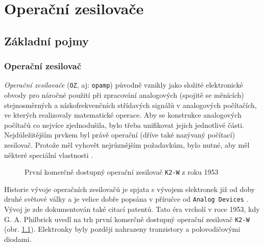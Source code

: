 \setchaptertoc
\chapter{Operační zesilovače}\label{aesIchIII}

  \section{Základní pojmy}\label{aesIchIIIsecI}
    \subsection{Operační zesilovač}\label{aesIchIIIsecIssecI}
      \emph{Operační zesilovače} (\texttt{OZ}, aj: \texttt{opamp}) původně vznikly jako složité
      elektronické obvody pro náročné použití při zpracování analogových (spojitě se měnících)
      stejnosměrných a nízkofrekvenčních střídavých signálů v analogových počítačích, ve kterých
      realizovaly matematické operace. Aby se konstrukce analogových počítačů co nejvíce
      zjednodušila, bylo třeba unifikovat jejich jednotlivé části. Nejdůležitějším prvkem byl právě
      operační (dříve také nazývaný počítací) zesilovač. Protože měl vyhovět nejrůznějším
      požadavkům, bylo nutné, aby měl některé speciální vlastnosti \cite[s.~12]{Belza2004}. 

      \begin{figure}[ht!]  %
        \centering
        \caption{První komerčně dostupný operační zesilovač \texttt{K2-W} z roku 1953
                \cite[s.~H.20]{Jung2005}}
        \label{aes:fig044}
      \end{figure} 

      Historie vývoje operačních zesilovačů je spjata s vývojem elektronek již od doby druhé světové
      války a je velice dobře popsána v příručce od \texttt{Analog Devices} \cite{Jung2005}. Vývoj
      je zde dokumentován také citací patentů. Tato éra vrcholí v roce 1953, kdy G. A. Philbrick
      uvedl na trh první komerčně dostupný operační zesilovač \texttt{K2-W} (obr. \ref{aes:fig044}).
      Elektronky byly později nahrazeny tranzistory a polovodičovými diodami. 
      
